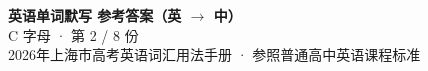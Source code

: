 \documentclass[10pt,a4paper]{article}
\begin{document}
\pagestyle{plain}

\begin{center}
{\LARGE\bfseries 英语单词默写 \quad 参考答案（英 $\to$ 中）}\\[0.22em]
{\large C 字母 · 第 2 / 8 份}\\[0.18em]
{\small 2026年上海市高考英语词汇用法手册 · 参照普通高中英语课程标准}
\end{center}

\vspace{0.2em}
\noindent{\color{rulegray}\rule{\textwidth}{0.8pt}}

\vspace{0.35em}

\vspace{0.25em}
\renewcommand{\arraystretch}{1.32}
\end{document}
